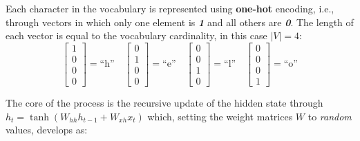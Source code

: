 Each character in the vocabulary is represented using \textbf{one-hot} encoding, i.e., through vectors in which only one element is \textit{\textbf{1}} and all others are \textit{\textbf{0}}. The length of each vector is equal to the vocabulary cardinality, in this case $|V|=4$:
\[
\begin{bmatrix} 1 \\ 0 \\ 0 \\ 0 \end{bmatrix} = \text{``h''} \quad
\begin{bmatrix} 0 \\ 1 \\ 0 \\ 0 \end{bmatrix} = \text{``e''} \quad
\begin{bmatrix} 0 \\ 0 \\ 1 \\ 0 \end{bmatrix} = \text{``l''} \quad
\begin{bmatrix} 0 \\ 0 \\ 0 \\ 1 \end{bmatrix} = \text{``o''}
\]

The core of the process is the recursive update of the hidden state through \\ $h_t = \tanh(W_{hh} h_{t-1} + W_{xh} x_t)$ which, setting the weight matrices $W$ to \textit{random} values, develops as:

